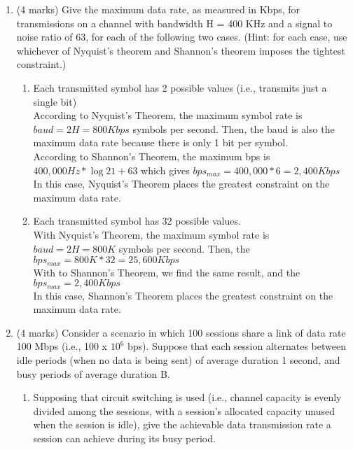 \documentclass[10pt]{amsart}
\begin{document}
\begin{enumerate}
    \item (4 marks) Give the maximum data rate, as measured in Kbps, for transmissions on a channel with bandwidth H = 400 KHz and a signal to noise ratio of 63, for each of the following two cases. (Hint: for each case, use whichever of Nyquist’s theorem and Shannon’s theorem imposes the tightest constraint.)
    \begin{enumerate}
        \item Each transmitted symbol has 2 possible values (i.e., transmits just a single bit)\\
            According to Nyquist's Theorem, the maximum symbol rate is $baud =
            2H = 800Kbps$ symbols per second.  Then, the baud is also the
            maximum data rate because there is only 1 bit per symbol.\\
            According to Shannon's Theorem, the maximum bps is
            $400,000Hz*\log{2}{1 + 63}$ which gives $bps_{max} = 400,000*6 =
            2,400Kbps$\\ In this case, Nyquist's Theorem places the greatest
            constraint on the maximum data rate.\\
        \item Each transmitted symbol has 32 possible values.\\
            With Nyquist's Theorem, the maximum symbol rate is $baud = 2H =
            800K$ symbols per second.  Then, the $bps_{max} = 800K * 32 =
            25,600Kbps$\\
            With to Shannon's Theorem, we find the same result, and the
            $bps_{max} = 2,400Kbps$\\ In this case, Shannon's Theorem places the
            greatest constraint on the maximum data rate.\\
    \end{enumerate}
    \item (4 marks) Consider a scenario in which 100 sessions share a link of data
    rate 100 Mbps (i.e., 100 x $10^6$ bps). Suppose that each session alternates
    between idle periods (when no data is being sent) of average duration 1
    second, and busy periods of average duration B.
    \begin{enumerate}
        \item Supposing that circuit switching is used (i.e., channel capacity
            is evenly divided among the sessions, with a session’s allocated
            capacity unused when the session is idle), give the achievable data
            transmission rate a session can achieve during its busy period.\\

\end{enumerate}
\end{enumerate}
\end{document}

